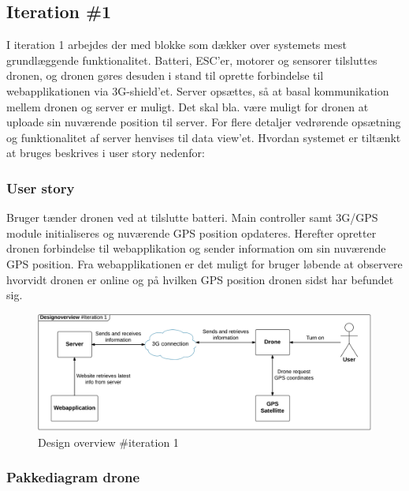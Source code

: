 \subsection{Iteration \#1}
\vspace{-0.4cm}
I iteration 1 arbejdes der med blokke som dækker over systemets mest grundlæggende funktionalitet. Batteri, ESC’er, motorer og sensorer tilsluttes dronen, og dronen gøres desuden i stand til oprette forbindelse til webapplikationen via 3G-shield’et.
Server opsættes, så at basal kommunikation mellem dronen og server er muligt. Det skal bla. være muligt for dronen at uploade sin nuværende position til server. For flere detaljer vedrørende opsætning og funktionalitet af server henvises til data view'et. 
Hvordan systemet er tiltænkt at bruges beskrives i user story nedenfor:

\subsubsection*{User story}
\vspace{-0.4cm}
Bruger tænder dronen ved at tilslutte batteri. Main controller samt 3G/GPS module initialiseres og nuværende GPS position opdateres. Herefter opretter dronen forbindelse til webapplikation og sender information om sin nuværende GPS position. Fra webapplikationen er det muligt for bruger løbende at observere hvorvidt dronen er online og på hvilken GPS position dronen sidst har befundet sig.

\begin{figure}[H]
	\centering
	\includegraphics[width=1\textwidth]{Billeder/design_overview/design_overview_iteration1.png}
	\vspace{-.5cm}
	\caption{Design overview \#iteration 1}
	\label{fig:design_overview_UC1}
\end{figure}


\newpage
\subsubsection*{Pakkediagram drone}

